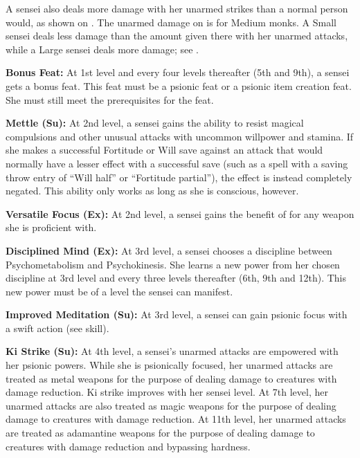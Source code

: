 {A sensei also deals more damage with her unarmed strikes than a normal person would, as shown on . The unarmed damage on  is for Medium monks. A Small sensei deals less damage than the amount given there with her unarmed attacks, while a Large sensei deals more damage; see .


\textbf{Bonus Feat:} At 1st level and every four levels thereafter (5th and 9th), a sensei gets a bonus feat. This feat must be a psionic feat or a psionic item creation feat. She must still meet the prerequisites for the feat.

\textbf{Mettle (Su):} At 2nd level, a sensei gains the ability to resist magical compulsions and other unusual attacks with uncommon willpower and stamina. If she makes a successful Fortitude or Will save against an attack that would normally have a lesser effect with a successful save (such as a spell with a saving throw entry of ``Will half'' or ``Fortitude partial''), the effect is instead completely negated. This ability only works as long as she is conscious, however.

\textbf{Versatile Focus (Ex):} At 2nd level, a sensei gains the benefit of  for any weapon she is proficient with.

\textbf{Disciplined Mind (Ex):} At 3rd level, a sensei chooses a discipline between Psychometabolism and Psychokinesis. She learns a new power from her chosen discipline at 3rd level and every three levels thereafter (6th, 9th and 12th). This new power must be of a level the sensei can manifest.

\textbf{Improved Meditation (Su):} At 3rd level, a sensei can gain psionic focus with a swift action (see  skill).

\textbf{Ki Strike (Su):} At 4th level, a sensei's unarmed attacks are empowered with her psionic powers. While she is psionically focused, her unarmed attacks are treated as metal weapons for the purpose of dealing damage to creatures with damage reduction. Ki strike improves with her sensei level. At 7th level, her unarmed attacks are also treated as magic weapons for the purpose of dealing damage to creatures with damage reduction. At 11th level, her unarmed attacks are treated as adamantine weapons for the purpose of dealing damage to creatures with damage reduction and bypassing hardness.

}
